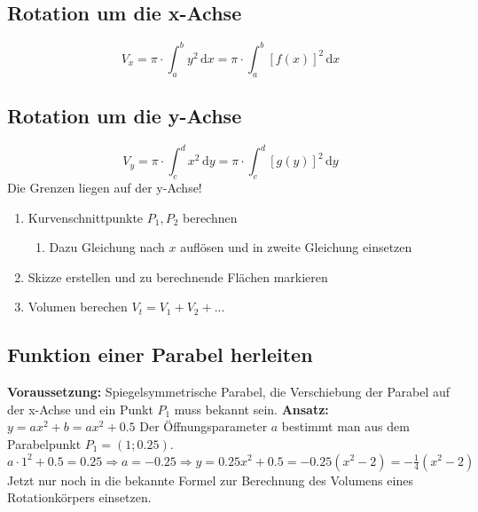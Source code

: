 \subsection{Rotation um die x-Achse} %
\label{sub:rotation_um_die_x_achse}
\[ V_x = \pi \cdot \int_a^b y^2\,\mathrm{d}x = \pi \cdot \int_a^b [f(x)]^2\,\mathrm{d}x \]
\subsection{Rotation um die y-Achse} %
\label{sub:rotation_um_die_y_achse}
\[ V_y = \pi \cdot \int_c^d x^2\,\mathrm{d}y = \pi \cdot \int_c^d [g(y)]^2\,\mathrm{d}y \]
Die Grenzen liegen auf der y-Achse! 
\begin{enumerate}
	\item Kurvenschnittpunkte \(P_1, P_2\) berechnen
	\begin{enumerate}
		\item Dazu Gleichung nach \(x\) auflösen und in zweite Gleichung einsetzen
	\end{enumerate}
	\item Skizze erstellen und zu berechnende Flächen markieren
	\item Volumen berechen \(V_t = V_1 + V_2 + ... \)
\end{enumerate}
\subsection{Funktion einer Parabel herleiten} %
\label{sub:funktion_einer_parabel_herleiten}
\textbf{Voraussetzung:} Spiegelsymmetrische Parabel, die Verschiebung der Parabel auf der x-Achse und ein Punkt \(P_1\) muss bekannt sein.\newline
\textbf{Ansatz:} \(y = ax^2 + b = ax^2 + 0.5\)\newline
Der Öffnungsparameter \(a\) bestimmt man aus dem Parabelpunkt \(P_1 = (1; 0.25) \).\newline
\( a \cdot 1^2 + 0.5 = 0.25 \Rightarrow a = -0.25 \Rightarrow y = 0.25x^2 + 0.5 = -0.25(x^2-2) = -\frac{1}{4}(x^2 - 2)\)\newline
Jetzt nur noch in die bekannte Formel zur Berechnung des Volumens eines Rotationkörpers einsetzen.
